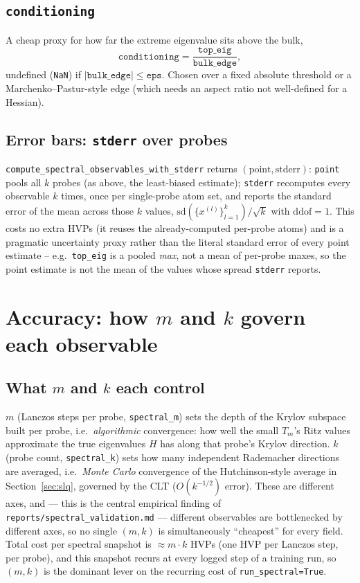 \documentclass[11pt]{article}
\newcommand{\code}[1]{\texttt{#1}}
\begin{document}
\subsection{\code{conditioning}}
A cheap proxy for how far the extreme eigenvalue sits above the bulk,
\[
\code{conditioning} = \frac{\code{top_eig}}{\code{bulk_edge}},
\]
undefined (\code{NaN}) if \(|\code{bulk_edge}| \le \code{eps}\). Chosen over
a fixed absolute threshold or a Marchenko--Pastur-style edge (which needs
an aspect ratio not well-defined for a Hessian).

\subsection{Error bars: \code{stderr} over probes}
\code{compute_spectral_observables_with_stderr} returns
\((\text{point}, \text{stderr})\): \code{point} pools all \(k\) probes (as
above, the least-biased estimate); \code{stderr} recomputes every
observable \(k\) times, once per single-probe atom set, and reports the
standard error of the mean across those \(k\) values,
\(\mathrm{sd}(\{x^{(l)}\}_{l=1}^k)/\sqrt{k}\) with \(\mathrm{ddof}=1\). This
costs no extra HVPs (it reuses the already-computed per-probe atoms) and is
a pragmatic uncertainty proxy rather than the literal standard error of
every point estimate -- e.g.\ \code{top_eig} is a pooled \emph{max}, not a
mean of per-probe maxes, so the point estimate is not the mean of the
values whose spread \code{stderr} reports.

\section{Accuracy: how \texorpdfstring{\(m\)}{m} and \texorpdfstring{\(k\)}{k} govern each observable}
\label{sec:accuracy}

\subsection{What \(m\) and \(k\) each control}

\(m\) (Lanczos steps per probe, \code{spectral_m}) sets the depth of the
Krylov subspace built per probe, i.e.\ \emph{algorithmic} convergence: how
well the small \(T_m\)'s Ritz values approximate the true eigenvalues
\(H\) has along that probe's Krylov direction. \(k\) (probe count,
\code{spectral_k}) sets how many independent Rademacher directions are
averaged, i.e.\ \emph{Monte Carlo} convergence of the Hutchinson-style
average in Section~\ref{sec:slq}, governed by the CLT (\(O(k^{-1/2})\)
error). These are different axes, and --- this is the central empirical
finding of \code{reports/spectral_validation.md} --- different observables
are bottlenecked by different axes, so no single \((m,k)\) is simultaneously
``cheapest'' for every field. Total cost per spectral snapshot is
\(\approx m \cdot k\) HVPs (one HVP per Lanczos step, per probe), and this
snapshot recurs at every logged step of a training run, so \((m,k)\) is the
dominant lever on the recurring cost of \code{run_spectral=True}.
\end{document}
